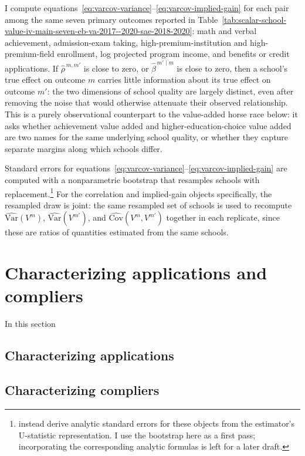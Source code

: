 \documentclass[a4paper, article, english, oneside, unknownkeysallowed, 12pt]{memoir}
\begin{document}
I compute equations~\eqref{eq:varcov-variance}--\eqref{eq:varcov-implied-gain} for each pair among the same seven primary outcomes reported in Table~\ref{tab:scalar-school-value-iv-main-seven-eb-va-2017--2020-sae-2018-2020}: math and verbal achievement, admission-exam taking, high-premium-institution and high-premium-field enrollment, log projected program income, and benefits or credit applications.
If $\widehat\rho^{\,m,m'}$ is close to zero, or $\widehat\beta^{\,m'\mid m}$ is close to zero, then a school's true effect on outcome $m$ carries little information about its true effect on outcome $m'$: the two dimensions of school quality are largely distinct, even after removing the noise that would otherwise attenuate their observed relationship.
This is a purely observational counterpart to the value-added horse race below: it asks whether achievement value added and higher-education-choice value added are two names for the same underlying school quality, or whether they capture separate margins along which schools differ.

Standard errors for equations~\eqref{eq:varcov-variance}--\eqref{eq:varcov-implied-gain} are computed with a nonparametric bootstrap that resamples schools with replacement.\footnote{\textcite{rose_effects_2022} instead derive analytic standard errors for these objects from the estimator's U-statistic representation. I use the bootstrap here as a first pass; incorporating the corresponding analytic formulas is left for a later draft.}
For the correlation and implied-gain objects specifically, the resampled draw is joint: the same resampled set of schools is used to recompute $\widehat{\mathrm{Var}}(V^m)$, $\widehat{\mathrm{Var}}(V^{m'})$, and $\widehat{\mathrm{Cov}}(V^m,V^{m'})$ together in each replicate, since these are ratios of quantities estimated from the same schools.

\clearpage

\section{Characterizing applications and compliers}

In this section 


\subsection{Characterizing applications}

\subsection{Characterizing compliers}
\end{document}
